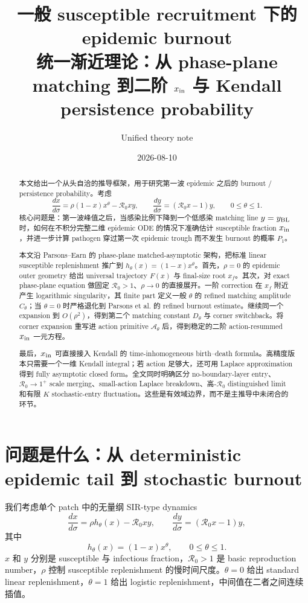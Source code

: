 \documentclass[11pt,a4paper]{ctexart}
\title{一般 susceptible recruitment 下的 epidemic burnout\\
\large 统一渐近理论：从 phase-plane matching 到二阶 $x_{\rm in}$ 与 Kendall persistence probability}
\author{Unified theory note}
\date{2026-08-10}
\newcommand{\Rzero}{\mathcal R_0}
\newcommand{\BL}{y_{\rm BL}}
\newcommand{\xin}{x_{\rm in}}
\newcommand{\Pone}{P_1}
\begin{document}
\maketitle

\begin{abstract}
本文给出一个从头自洽的推导框架，用于研究第一波 epidemic 之后的 burnout / persistence probability。考虑
\[
\frac{dx}{d\sigma}=\rho(1-x)x^\theta-\Rzero xy,
\qquad
\frac{dy}{d\sigma}=(\Rzero x-1)y,
\qquad 0\leq\theta\leq1.
\]
核心问题是：第一波峰值之后，当感染比例下降到一个低感染 matching line $y=\BL$ 时，如何在不积分完整二维 epidemic ODE 的情况下准确估计 susceptible fraction $\xin$，并进一步计算 pathogen 穿过第一次 epidemic trough 而不发生 burnout 的概率 $\Pone$。

本文沿 Parsons--Earn 的 phase-plane matched-asymptotic 架构，把标准 linear susceptible replenishment 推广到 $h_\theta(x)=(1-x)x^\theta$。首先，$\rho=0$ 的 epidemic outer geometry 给出 universal trajectory $F(x)$ 与 final-size root $x_f$。其次，对 exact phase-plane equation 做固定 $\Rzero>1$、$\rho\to0$ 的直接展开。一阶 correction 在 $x_f$ 附近产生 logarithmic singularity，其 finite part 定义一般 $\theta$ 的 refined matching amplitude $C_\theta$；当 $\theta=0$ 时严格退化到 Parsons et al. 的 refined burnout estimate。继续同一个 expansion 到 $O(\rho^2)$，得到第二个 matching constant $D_\theta$ 与 corner switchback。将 corner expansion 重写进 action primitive $\mathcal A_\theta$ 后，得到稳定的二阶 action-resummed $x_{\rm in}$ 一元方程。

最后，$x_{\rm in}$ 可直接接入 Kendall 的 time-inhomogeneous birth--death formula。高精度版本只需要一个一维 Kendall integral；若 action 足够大，还可用 Laplace approximation 得到 fully asymptotic closed form。全文同时明确区分 no-boundary-layer entry、$\Rzero\to1^+$ scale merging、small-action Laplace breakdown、高-$\Rzero$ distinguished limit 和有限 $K$ stochastic-entry fluctuation。这些是有效域边界，而不是主推导中未闭合的环节。
\end{abstract}

\section{问题是什么：从 deterministic epidemic tail 到 stochastic burnout}
我们考虑单个 patch 中的无量纲 SIR-type dynamics
\begin{equation}
\label{eq:model}
\frac{dx}{d\sigma}=\rho h_\theta(x)-\Rzero xy,
\qquad
\frac{dy}{d\sigma}=(\Rzero x-1)y,
\end{equation}
其中
\begin{equation}
\label{eq:h}
h_\theta(x)=(1-x)x^\theta,
\qquad 0\leq\theta\leq1.
\end{equation}
$x$ 和 $y$ 分别是 susceptible 与 infectious fraction，$\Rzero>1$ 是 basic reproduction number，$\rho$ 控制 susceptible replenishment 的慢时间尺度。$\theta=0$ 给出 standard linear replenishment，$\theta=1$ 给出 logistic replenishment，中间值在二者之间连续插值。
\end{document}
